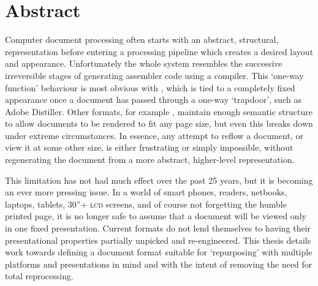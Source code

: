 \cleardoublepage
\begingroup
\let\clearpage\relax
\let\cleardoublepage\relax
\let\cleardoublepage\relax

\chapter*{Abstract}
Computer document processing often starts with an abstract, structural, representation before
entering a processing pipeline which creates a desired layout and appearance. Unfortunately the
whole system resembles the successive irreversible stages of generating assembler code using a
compiler. This `one-way function' behaviour is most obvious with \pdf{}, which is tied to a
completely
fixed appearance once a document has passed through a one-way `trapdoor', such as Adobe Distiller.
Other formats, for example \html{}, maintain enough semantic structure to allow documents to be
rendered to fit any page size, but even this breaks down under extreme circumstances. In essence,
any attempt to reflow a document, or view it at some other size, is either frustrating or simply
impossible, without regenerating the document from a more abstract, higher-level representation.

This limitation has not had much effect over the past 25 years, but it is becoming an ever more
pressing issue. In a world of smart phones, \ebook{} readers, netbooks, laptops, tablets,
30''+ \textsc{lcd} screens, and of course not forgetting the humble printed page, it is no longer
safe to assume that a document will be viewed only in one fixed presentation. Current formats do not
lend themselves to having their presentational properties partially unpicked and re-engineered. This
thesis details work towards defining a document format suitable for `repurposing' with multiple
platforms and presentations in mind and with the intent of removing the need for total reprocessing.

\endgroup

\vfill